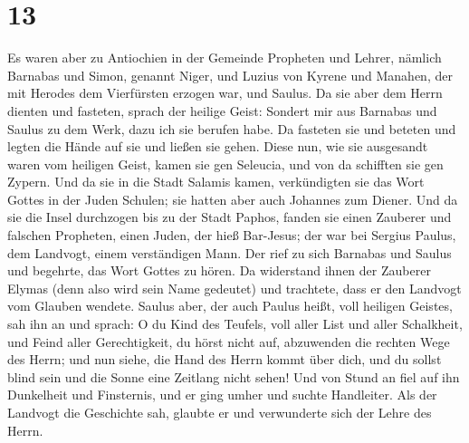 \hypertarget{section-12}{%
\section{13}\label{section-12}}

 Es waren aber zu Antiochien in der Gemeinde Propheten und
Lehrer, nämlich Barnabas und Simon, genannt Niger, und Luzius von Kyrene
und Manahen, der mit Herodes dem Vierfürsten erzogen war, und Saulus.
 Da sie aber dem Herrn dienten und fasteten, sprach der
heilige Geist: Sondert mir aus Barnabas und Saulus zu dem Werk, dazu ich
sie berufen habe.  Da fasteten sie und beteten und legten
die Hände auf sie und ließen sie gehen.  Diese nun, wie
sie ausgesandt waren vom heiligen Geist, kamen sie gen Seleucia, und von
da schifften sie gen Zypern.  Und da sie in die Stadt
Salamis kamen, verkündigten sie das Wort Gottes in der Juden Schulen;
sie hatten aber auch Johannes zum Diener.  Und da sie die
Insel durchzogen bis zu der Stadt Paphos, fanden sie einen Zauberer und
falschen Propheten, einen Juden, der hieß Bar-Jesus;  der
war bei Sergius Paulus, dem Landvogt, einem verständigen Mann. Der rief
zu sich Barnabas und Saulus und begehrte, das Wort Gottes zu hören.
 Da widerstand ihnen der Zauberer Elymas (denn also wird
sein Name gedeutet) und trachtete, dass er den Landvogt vom Glauben
wendete.  Saulus aber, der auch Paulus heißt, voll
heiligen Geistes, sah ihn an  und sprach: O du Kind des
Teufels, voll aller List und aller Schalkheit, und Feind aller
Gerechtigkeit, du hörst nicht auf, abzuwenden die rechten Wege des
Herrn;  und nun siehe, die Hand des Herrn kommt über
dich, und du sollst blind sein und die Sonne eine Zeitlang nicht sehen!
Und von Stund an fiel auf ihn Dunkelheit und Finsternis, und er ging
umher und suchte Handleiter.  Als der Landvogt die
Geschichte sah, glaubte er und verwunderte sich der Lehre des Herrn.

